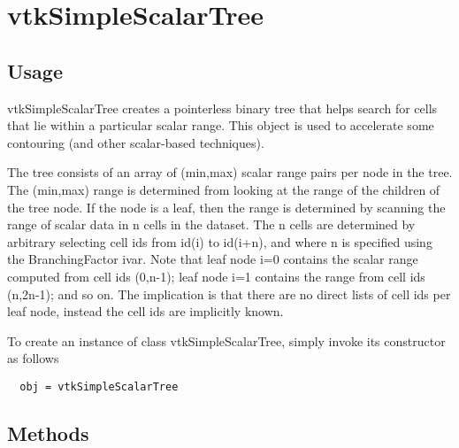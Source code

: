 \section{vtkSimpleScalarTree}

\subsection{Usage}

 vtkSimpleScalarTree creates a pointerless binary tree that helps search for
 cells that lie within a particular scalar range. This object is used to
 accelerate some contouring (and other scalar-based techniques).
 
 The tree consists of an array of (min,max) scalar range pairs per node in
 the tree. The (min,max) range is determined from looking at the range of
 the children of the tree node. If the node is a leaf, then the range is
 determined by scanning the range of scalar data in n cells in the
 dataset. The n cells are determined by arbitrary selecting cell ids from
 id(i) to id(i+n), and where n is specified using the BranchingFactor
 ivar. Note that leaf node i=0 contains the scalar range computed from
 cell ids (0,n-1); leaf node i=1 contains the range from cell ids (n,2n-1);
 and so on. The implication is that there are no direct lists of cell ids
 per leaf node, instead the cell ids are implicitly known.

To create an instance of class vtkSimpleScalarTree, simply
invoke its constructor as follows
\begin{verbatim}
  obj = vtkSimpleScalarTree
\end{verbatim}
\subsection{Methods}

